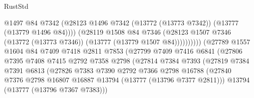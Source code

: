 \begin{lexlean}{RustStd}
\begin{coremodule}
                                        @1497
                                        @84
                                        @7342
                                        (@28123
                                          @1496
                                          @7342
                                          (@13772 (@13773 @7342))
                                          (@13777 (@13779 @1496 @84))))
                                      (@28119
                                        @1508
                                        @84
                                        @7346
                                        (@28123
                                          @1507
                                          @7346
                                          (@13772 (@13773 @7346))
                                          (@13777 (@13779 @1507 @84))))))))))
                          (@27789
                            @1557
                            @1604
                            @84
                            @7409
                            @7418
                            @2811
                            @7853
                            (@27799
                              @7409
                              @7416
                              @6841
                              (@27806
                                @7395
                                @7408
                                @7415
                                @2792
                                @7358
                                @2798
                                (@27814
                                  @7384
                                  @7393
                                  (@27819
                                    @7384
                                    @7391
                                    @6813
                                    (@27826
                                      @7383
                                      @7390
                                      @2792
                                      @7366
                                      @2798
                                      @16788
                                      (@27840
                                        @7376
                                        @2798
                                        @16807
                                        @16887
                                        @13794
                                        (@13777 (@13796 @7377 @2811)))
                                      @13794
                                      (@13777 (@13796 @7367 @7383)))

\end{coremodule}
\end{lexlean}
